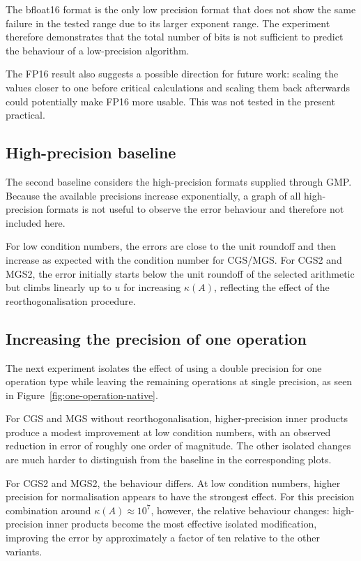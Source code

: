 \documentclass[a4paper,11pt]{article}
\begin{document}
The bfloat16 format is the only low precision format that does not show the 
same failure in the tested range due to its
larger exponent range. The experiment therefore demonstrates that the total
number of bits is not sufficient to predict the behaviour of a low-precision
algorithm.

The FP16 result also suggests a possible direction for future work: scaling
the values closer to one before critical calculations and scaling them back
afterwards could potentially make FP16 more usable. This was not tested in
the present practical.

\subsection{High-precision baseline}

The second baseline considers the high-precision formats supplied through GMP.
Because the available precisions increase exponentially, a graph of all high-precision 
formats is not useful to observe the error behaviour and therefore not included here.

For low condition numbers, the errors are close to the unit roundoff and then
increase as expected with the condition number for CGS/MGS. For CGS2 and MGS2, the error initially
starts below the unit roundoff of the selected arithmetic but climbs linearly up to $u$ for 
increasing $\kappa(A)$, reflecting the effect of the reorthogonalisation procedure.

\subsection{Increasing the precision of one operation}

The next experiment isolates the effect of using a double precision for one
operation type while leaving the remaining operations at single
precision, as seen in Figure~\ref{fig:one-operation-native}.

For CGS and MGS without reorthogonalisation, higher-precision inner products
produce a modest improvement at low condition numbers, with an observed
reduction in error of roughly one order of magnitude. The other isolated
changes are much harder to distinguish from the baseline in the corresponding
plots.

For CGS2 and MGS2, the behaviour differs. At low condition numbers, higher
precision for normalisation appears to have the strongest effect. 
For this precision combination around
$\kappa(A)\approx10^7$, however, the relative behaviour changes: high-precision
inner products become the most effective isolated modification, improving the
error by approximately a factor of ten relative to the other variants.
\end{document}
